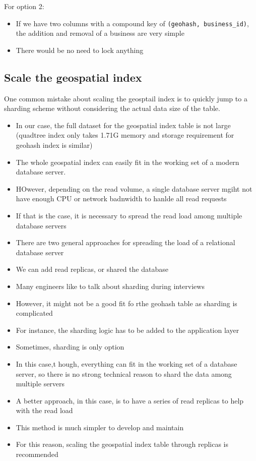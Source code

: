 \documentclass{report}
\theoremstyle{definition}
\let\oldsubsection\subsection
\renewcommand{\subsection}{\oldsubsection*}
\begin{document}
For option 2:

\begin{itemize}
\item
If we have two columns with a compound key of \lstinline|(geohash, business_id)|, the addition and removal of a business are very simple
\item
There would be no need to lock anything
\end{itemize}

\subsection{Scale the geospatial index}

One common mistake about scaling the geosptail index is to quickly jump to a sharding scheme without considering the actual data size of the table.

\begin{itemize}
\item
In our case, the full dataset for the geospatial index table is not large (quadtree index only takes 1.71G memory and storage requirement for geohash index is similar)
\item
The whole geospatial index can easily fit in the working set of a modern database server.
\item
HOwever, depending on the read volume, a single database server mgiht not have enough CPU or network badnwidth to hanlde all read requests
\item
If that is the case, it is necessary to spread the read load among multiple database servers
\item
There are two general approaches for spreading the load of a relational database server
\item
We can add read replicas, or shared the database
\item
Many engineers like to talk about sharding during interviews
\item
However, it might not be a good fit fo rthe geohash table as sharding is complicated
\item
For instance, the sharding logic has to be added to the application layer
\item
Sometimes, sharding is only option
\item
In this case,t hough, everything can fit in the working set of a database server, so there is no strong technical reason to shard the data among multiple servers
\item
A better approach, in this case, is to have a series of read replicas to help with the read load
\item
This method is much simpler to develop and maintain
\item
For this reason, scaling the geospatial index table through replicas is recommended
\end{itemize}
\end{document}
